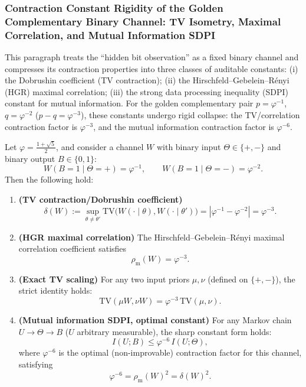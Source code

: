 \subsubsection{Contraction Constant Rigidity of the Golden Complementary Binary Channel: TV Isometry, Maximal Correlation, and Mutual Information SDPI}\label{subsubsec:pom-golden-channel-contraction-sdpi}

This paragraph treats the ``hidden bit observation'' as a fixed binary channel and compresses its contraction properties into three classes of auditable constants:
(i) the Dobrushin coefficient (TV contraction); (ii) the Hirschfeld--Gebelein--R\'enyi (HGR) maximal correlation; (iii) the strong data processing inequality (SDPI) constant for mutual information.
For the golden complementary pair \(p=\varphi^{-1}\), \(q=\varphi^{-2}\) (\(p-q=\varphi^{-3}\)), these constants undergo rigid collapse: the TV/correlation contraction factor is \(\varphi^{-3}\), and the mutual information contraction factor is \(\varphi^{-6}\).

\begin{theorem}[Contraction constant rigidity of the golden complementary binary channel: \texorpdfstring{$\delta=\rho_{\mathrm{m}}=\varphi^{-3}$}{delta=rho_m=phi^{-3}} and \texorpdfstring{$I$}{I}-contraction \texorpdfstring{$\varphi^{-6}$}{phi^{-6}}]\label{thm:pom-golden-binary-channel-contraction}
Let \(\varphi=\frac{1+\sqrt5}{2}\), and consider a channel \(W\) with binary input \(\Theta\in\{+,-\}\) and binary output \(B\in\{0,1\}\):
\[
W(B=1\mid \Theta=+)=\varphi^{-1},\qquad
W(B=1\mid \Theta=-)=\varphi^{-2}.
\]
Then the following hold:
\begin{enumerate}
  \item \textbf{(TV contraction/Dobrushin coefficient)}
  \[
  \delta(W)
  :=\sup_{\theta\neq\theta'}\mathrm{TV}\bigl(W(\cdot\mid\theta),W(\cdot\mid\theta')\bigr)
  =|\varphi^{-1}-\varphi^{-2}|
  =\varphi^{-3}.
  \]
  \item \textbf{(HGR maximal correlation)} The Hirschfeld--Gebelein--R\'enyi maximal correlation coefficient satisfies
  \[
  \rho_{\mathrm{m}}(W)=\varphi^{-3}.
  \]
  \item \textbf{(Exact TV scaling)} For any two input priors \(\mu,\nu\) (defined on \(\{+,-\}\)), the strict identity holds:
  \[
  \mathrm{TV}(\mu W,\nu W)=\varphi^{-3}\,\mathrm{TV}(\mu,\nu).
  \]
  \item \textbf{(Mutual information SDPI, optimal constant)} For any Markov chain \(U\to \Theta\to B\) (\(U\) arbitrary measurable), the sharp constant form holds:
  \[
  I(U;B)\le \varphi^{-6}\,I(U;\Theta),
  \]
  where \(\varphi^{-6}\) is the optimal (non-improvable) contraction factor for this channel, satisfying
  \[
  \varphi^{-6}=\rho_{\mathrm{m}}(W)^2=\delta(W)^2.
  \]
\end{enumerate}
\end{theorem}

